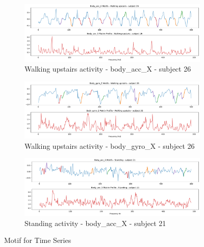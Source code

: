 \documentclass[10pt, a4paper, twocolumn]{article}
\begin{document}
\begin{figure}
    \centering

        \begin{subfigure}{\columnwidth}
    \includegraphics[width=\columnwidth]{immagini Lia/motifs walking upstairs.pdf}
    \caption{Walking upstairs activity - body\_acc\_X - subject 26}
    \label{fig:walkingmotif}
    \end{subfigure}
    
    \begin{subfigure}{\columnwidth}

    \includegraphics[width=\columnwidth]{immagini Lia/motifs gyro z walking upstairs.pdf}
    \caption{Walking upstairs activity - body\_gyro\_X - subject 26 }
    \label{fig:gyroxmotiv}
    \end{subfigure}
    
    \begin{subfigure}{\columnwidth}

    \includegraphics[width=\columnwidth]{immagini Lia/motifs standing.pdf}
    \caption{Standing activity - body\_acc\_X - subject 21}
    \label{fig:standingmotiv}
    \end{subfigure}
    \caption{Motif for Time Series}\label{motiv1}
\end{figure}
\end{document}
